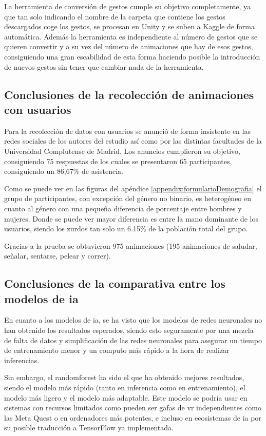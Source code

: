 La herramienta de conversión de gestos cumple su objetivo completamente, ya que tan solo indicando el nombre de la carpeta que contiene los gestos descargados coge los gestos, se procesan en Unity y se suben a Kaggle de forma automática.
Además la herramienta es independiente al número de gestos que se quieren convertir y a su vez del número de animaciones que hay de esos gestos, consiguiendo una gran escabilidad de esta forma haciendo posible la introducción de nuevos gestos sin tener que cambiar nada de la herramienta.

\subsection{Conclusiones de la recolección de animaciones con usuarios}
Para la recolección de datos con usuarios se anunció de forma insistente en las redes sociales de los autores del estudio así como por las distintas facultades de la Universidad Complutense de Madrid.
Los anuncios cumplieron su objetivo, consiguiendo 75 respuestas de los cuales se presentaron 65 participantes, consiguiendo un 86,67\% de asistencia.

Como se puede ver en las figuras del apéndice \ref{appendix:formularioDemografia} el grupo de participantes, con excepción del género no binario, es heterogéneo en cuanto al género con una pequeña diferencia de porcentaje entre hombres y mujeres.
Donde se puede ver mayor diferencia es entre la mano dominante de los usuarios, siendo los zurdos tan solo un 6.15\% de la población total del grupo.

Gracias a la prueba se obtuvieron 975 animaciones (195 animaciones de saludar, señalar, sentarse, pelear y correr).

\subsection{Conclusiones de la comparativa entre los modelos de \gls{ia}}

En cuanto a los modelos de \gls{ia}, se ha visto que los modelos de redes neuronales no han obtenido los resultados esperados, siendo esto seguramente por una mezcla de falta de datos y simplificación de las redes neuronales para asegurar un tiempo de entrenamiento menor y un computo más rápido a la hora de realizar inferencias.

Sin embargo, el \gls{randomforest} ha sido el que ha obtenido mejores resultados, siendo el modelo más rápido (tanto en inferencia como en entrenamiento), el modelo más ligero y el modelo más adaptable. Este modelo se podría usar en sistemas con recursos limitados como pueden ser gafas de \gls{vr} independientes como las Meta Quest o en ordenadores más potentes, e incluso en ecosistemas de \gls{ia} por su posible traducción a TensorFlow ya implementada.

